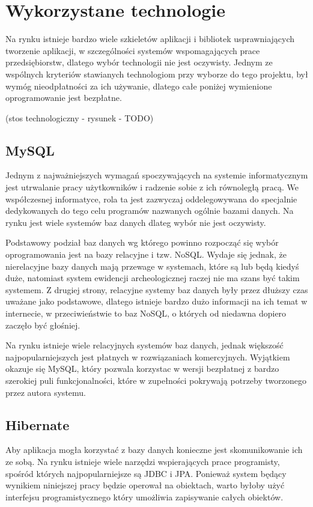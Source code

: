 \chapter{Wykorzystane technologie}
Na rynku istnieje bardzo wiele szkieletów aplikacji i bibliotek usprawniających tworzenie aplikacji, w szczególności systemów wspomagających prace przedsiębiorstw, dlatego wybór technologii nie jest oczywisty. Jednym ze wspólnych kryteriów stawianych technologiom przy wyborze do tego projektu, był wymóg nieodpłatności za ich używanie, dlatego całe poniżej wymienione oprogramowanie jest bezpłatne.

(stos technologiczny - rysunek - TODO)

\section{MySQL}
Jednym z najważniejszych wymagań spoczywających na systemie informatycznym jest utrwalanie pracy użytkowników i radzenie sobie z ich równoległą pracą. We współczesnej informatyce, rola ta jest zazwyczaj oddelegowywana do specjalnie dedykowanych do tego celu programów nazwanych ogólnie bazami danych. Na rynku jest wiele systemów baz danych dlateg wybór nie jest oczywisty.

Podstawowy podział baz danych wg którego powinno rozpocząć się wybór oprogramowania jest na bazy relacyjne i tzw. NoSQL. Wydaje się jednak, że nierelacyjne bazy danych mają przewage w systemach, które są lub będą kiedyś duże, natomiast system ewidencji archeologicznej raczej nie ma szans być takim systemem. Z drugiej strony, relacyjne systemy baz danych były przez dłuższy czas uważane jako podstawowe, dlatego istnieje bardzo dużo informacji na ich temat w internecie, w przeciwieństwie to baz NoSQL, o których od niedawna dopiero zaczęło być głośniej.

Na rynku istnieje wiele relacyjnych systemów baz danych, jednak większość najpopularniejszych jest płatnych w rozwiązaniach komercyjnych. Wyjątkiem okazuje się MySQL, który pozwala korzystac w wersji bezpłatnej z bardzo szerokiej puli funkcjonalności, które w zupełności pokrywają potrzeby tworzonego przez autora systemu.
\newpage
\section{Hibernate}
Aby aplikacja mogła korzystać z bazy danych konieczne jest skomunikowanie ich ze sobą. Na rynku istnieje wiele narzędzi wspierających prace programisty, spośród których najpopularniejsze są JDBC i JPA. Ponieważ system będący wynikiem niniejszej pracy będzie operował na obiektach, warto byłoby użyć interfejsu programistycznego który umożliwia zapisywanie całych obiektów.

